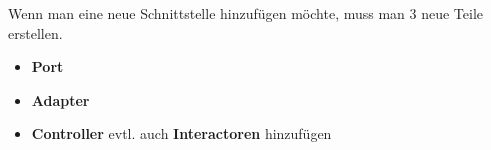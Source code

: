 Wenn man eine neue Schnittstelle hinzufügen möchte, muss man 3 neue Teile erstellen.
    \begin{itemize}
        \item \textbf{Port}
        \item \textbf{Adapter}
        \item \textbf{Controller} evtl. auch \textbf{Interactoren} hinzufügen
    \end{itemize}